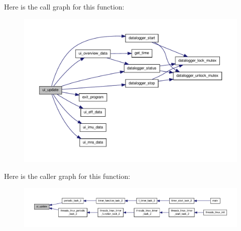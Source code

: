 Here is the call graph for this function\-:
\nopagebreak
\begin{figure}[H]
\begin{center}
\leavevmode
\includegraphics[width=350pt]{group__ui_ga1559840369fc944a83a3666ef7959413_cgraph}
\end{center}
\end{figure}




Here is the caller graph for this function\-:
\nopagebreak
\begin{figure}[H]
\begin{center}
\leavevmode
\includegraphics[width=350pt]{group__ui_ga1559840369fc944a83a3666ef7959413_icgraph}
\end{center}
\end{figure}


